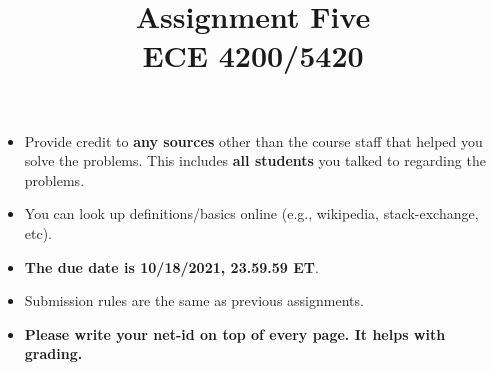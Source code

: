 \documentclass[11pt]{article}
\title{Assignment Five\\ ECE 4200/5420}
\date{}
\begin{document}
\maketitle 


\begin{itemize}
\item
Provide credit to \textbf{any sources} other than the course staff that helped you solve the problems. This includes \textbf{all students} you talked to regarding the problems. 	
\item
You can look up definitions/basics online (e.g., wikipedia, stack-exchange, etc).
\item
{\bf The due date is 10/18/2021, 23.59.59 ET}. 
\item
Submission rules are the same as previous assignments.
\item
\textbf{Please write your net-id on top of every page. It helps with grading.}
\end{itemize}
\end{document}
